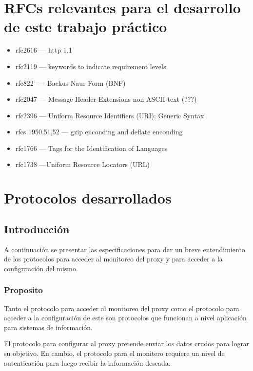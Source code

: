\documentclass[a4paper,10pt]{article}
\begin{document}
\setcounter{page}{1}

\tableofcontents

\newpage
\section{RFCs relevantes para el desarrollo de este trabajo pr\'actico}

\begin{itemize}
 \item rfc2616 --- http 1.1
 \item rfc2119 --- keywords to indicate requirement levels
 \item rfc822 ---- Backus-Naur Form (BNF)
 \item rfc2047 --- Message Header Extensions non ASCII-text (???)
 \item rfc2396 --- Uniform Resource Identifiers (URI): Generic Syntax

 \item rfcs 1950,51,52 --- gzip enconding and deflate enconding
 \item rfc1766 --- Tags for the Identification of Languages
 \item rfc1738 ---Uniform Resource Locators (URL)
\end{itemize}


\newpage
\section{Protocolos desarrollados}

    \subsection{Introducci\'on}

    A continuación se presentar las especificaciones para dar un breve entendimiento 
    de los protocolos para acceder al monitoreo del proxy y para acceder a la configuraci\'on del mismo.

        \subsubsection{Proposito}

        Tanto el protocolo para acceder al monitoreo del proxy como el protocolo para acceder a la 
        configuración de este son protocolos que funcionan a nivel aplicación para sistemas de informaci\'on.

        El protocolo para configurar al proxy pretende enviar los datos crudos para lograr su objetivo. En cambio, 
        el protocolo para el monitero requiere un nivel de autenticaci\'on para luego recibir la informaci\'on 
        deseada. 
\end{document}

